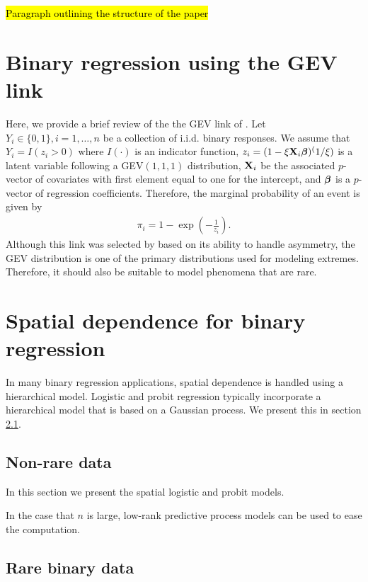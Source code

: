 \documentclass[11pt]{article}
\begin{document}
\hl{Paragraph outlining the structure of the paper}

\section{Binary regression using the GEV link}\label{s:rarebinary}

Here, we provide a brief review of the the GEV link of \citet{Wang2010}.
Let $Y_i \in \{0, 1\}, i = 1, \ldots, n$ be a collection of i.i.d. binary responses.
We assume that $Y_i = I(z_i > 0)$ where $I(\cdot)$ is an indicator function, $z_i = (1 - \xi \mbox{\bf X}_i \mbox{\boldmath $\beta$})^(1 / \xi)$ is a latent variable following a GEV$(1, 1, 1)$ distribution, $\mbox{\bf X}_i$ be the associated $p$-vector of covariates with first element equal to one for the intercept, and $\mbox{\boldmath $\beta$}$ is a $p$-vector of regression coefficients.
Therefore, the marginal probability of an event is given by
\begin{align} \label{eq:gevlink}
  \pi_i= 1 - \exp \left( -\frac{ 1 }{ z_i } \right).
\end{align}
Although this link was selected by \citeauthor{Wang2010} based on its ability to handle asymmetry, the GEV distribution is one of the primary distributions used for modeling extremes.
Therefore, it should also be suitable to model phenomena that are rare.

\section{Spatial dependence for binary regression}

In many binary regression applications, spatial dependence is handled using a hierarchical model.
Logistic and probit regression typically incorporate a hierarchical model that is based on a Gaussian process.
We present this in section \ref{s:nonrarespatial}.

\subsection{Non-rare data}\label{s:nonrarespatial}

In this section we present the spatial logistic and probit models.

In the case that $n$ is large, low-rank predictive process models can be used to ease the computation.

\subsection{Rare binary data}\label{s:rarebinary}
\end{document}
